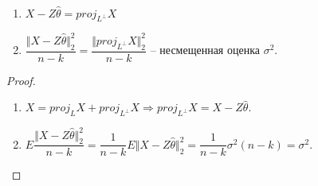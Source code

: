 \begin{corollary} ~
    \begin{enumerate}
        \item $\displaystyle X-Z\hat{\theta } =proj_{L^{\perp }} X$
        \item $\displaystyle \dfrac{\Vert X-Z\hat{\theta }\Vert _{2}^{2}}{n-k} =\dfrac{\Vert proj_{L^{\perp }} X\Vert _{2}^{2}}{n-k}$ -- несмещенная оценка $\displaystyle \sigma ^{2}$.
    \end{enumerate}
\end{corollary}
\begin{proof} ~
    \begin{enumerate}
        \item $\displaystyle X=proj_{L} X+proj_{L^{\perp }} X\Rightarrow proj_{L^{\perp }} X=X-Z\hat{\theta }$.
        \item $\displaystyle E\dfrac{\Vert X-Z\hat{\theta }\Vert _{2}^{2}}{n-k} =\dfrac{1}{n-k} E\Vert X-Z\hat{\theta }\Vert _{2}^{2} =\dfrac{1}{n-k} \sigma ^{2}( n-k) =\sigma ^{2}$.
    \end{enumerate}
\end{proof}
